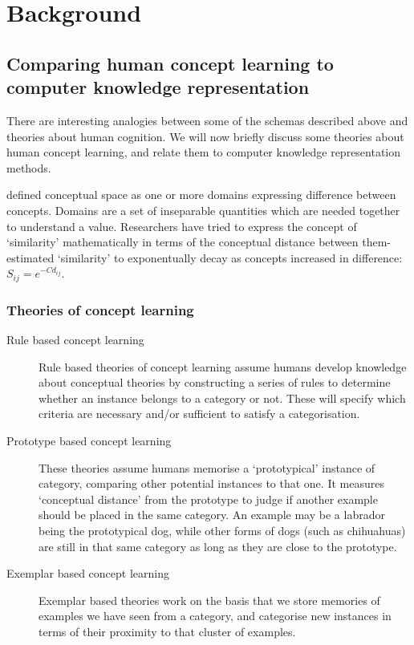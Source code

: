 \documentclass[12pt,MSc,wordcount,twoside]{muthesis}
\begin{document}
    \section{Background}
    


    \subsection{Comparing human concept learning to computer knowledge representation}
    There are interesting analogies between some of the schemas described above and theories about human cognition. We will now briefly discuss some theories about human concept learning, and relate them to computer knowledge representation methods. 

    \citealt{gardenfors2004conceptual} defined conceptual space as one or more domains expressing difference between concepts. Domains are a set of inseparable quantities which are needed together to understand a value. Researchers have tried to express the concept of `similarity' mathematically in terms of the conceptual distance between them- \citeauthor{shepard1987toward} estimated `similarity' to exponentually decay as concepts increased in difference: \(S_{ij}=e^{-Cd_{ij}}\).

    \subsubsection{Theories of concept learning}
    \begin{description}
        \item[Rule based concept learning] Rule based theories of concept learning assume humans develop knowledge about conceptual theories by constructing a series of rules to determine whether an instance belongs to a category or not. These will specify which criteria are necessary and/or sufficient to satisfy a categorisation.\cite{rouder2006comparing}
        \item[Prototype based concept learning] These theories assume humans memorise a `prototypical' instance of category, comparing other potential instances to that one.\cite{griffiths2007unifying} It measures `conceptual distance' from the prototype to judge if another example should be placed in the same category. An example may be a labrador being the prototypical dog, while other forms of dogs (such as chihuahuas) are still in that same category as long as they are close to the prototype.
        \item[Exemplar based concept learning] Exemplar based theories work on the basis that we store memories of examples we have seen from a category, and categorise new instances in terms of their proximity to that cluster of examples.\cite{griffiths2007unifying}
    \end{description}
\end{document}
